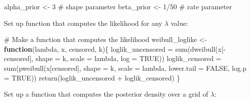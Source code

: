 \documentclass[
  letterpaper,
  DIV=11,
  numbers=noendperiod]{scrartcl}
\newenvironment{Shaded}{\begin{snugshade}}{\end{snugshade}}
\newcommand{\AttributeTok}[1]{\textcolor[rgb]{0.40,0.45,0.13}{#1}}
\newcommand{\CommentTok}[1]{\textcolor[rgb]{0.37,0.37,0.37}{#1}}
\newcommand{\ConstantTok}[1]{\textcolor[rgb]{0.56,0.35,0.01}{#1}}
\newcommand{\ControlFlowTok}[1]{\textcolor[rgb]{0.00,0.23,0.31}{\textbf{#1}}}
\newcommand{\DecValTok}[1]{\textcolor[rgb]{0.68,0.00,0.00}{#1}}
\newcommand{\FunctionTok}[1]{\textcolor[rgb]{0.28,0.35,0.67}{#1}}
\newcommand{\NormalTok}[1]{\textcolor[rgb]{0.00,0.23,0.31}{#1}}
\newcommand{\OtherTok}[1]{\textcolor[rgb]{0.00,0.23,0.31}{#1}}
\newcommand{\SpecialCharTok}[1]{\textcolor[rgb]{0.37,0.37,0.37}{#1}}
\begin{document}
\begin{tcolorbox}
\begin{Shaded}
\begin{Highlighting}[]
\NormalTok{alpha\_prior }\OtherTok{\textless{}{-}} \DecValTok{3}     \CommentTok{\# shape parameter}
\NormalTok{beta\_prior }\OtherTok{\textless{}{-}} \DecValTok{1}\SpecialCharTok{/}\DecValTok{50}   \CommentTok{\# rate parameter}
\end{Highlighting}
\end{Shaded}

Set up function that computes the likelihood for any \(\lambda\) value:

\begin{Shaded}
\begin{Highlighting}[]
\CommentTok{\# Make a function that computes the likelihood}
\NormalTok{weibull\_loglike }\OtherTok{\textless{}{-}} \ControlFlowTok{function}\NormalTok{(lambda, x, censored, k)\{}
\NormalTok{  loglik\_uncensored }\OtherTok{=} \FunctionTok{sum}\NormalTok{(}\FunctionTok{dweibull}\NormalTok{(x[}\SpecialCharTok{{-}}\NormalTok{censored], }\AttributeTok{shape =}\NormalTok{ k, }\AttributeTok{scale =}\NormalTok{ lambda, }
                                   \AttributeTok{log =} \ConstantTok{TRUE}\NormalTok{))}
\NormalTok{  loglik\_censored }\OtherTok{=} \FunctionTok{sum}\NormalTok{(}\FunctionTok{pweibull}\NormalTok{(x[censored], }\AttributeTok{shape =}\NormalTok{ k, }\AttributeTok{scale =}\NormalTok{ lambda, }
                                 \AttributeTok{lower.tail =} \ConstantTok{FALSE}\NormalTok{, }\AttributeTok{log.p =} \ConstantTok{TRUE}\NormalTok{))}
  \FunctionTok{return}\NormalTok{(loglik\_uncensored }\SpecialCharTok{+}\NormalTok{ loglik\_censored)}
\NormalTok{\}}
\end{Highlighting}
\end{Shaded}

Set up a function that computes the posterior density over a grid of
\(\lambda\):


\end{tcolorbox}
\end{document}
